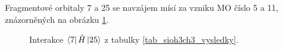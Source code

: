 \documentclass[
  digital, %
  table,   %
  lof,     %
  lot,     %
]{fithesis3}
\begin{document}
Fragmentové orbitaly  7 a 25 se navzájem mísí za vzniku MO číslo 5 a 11, znázorněných na obrázku \ref{obr_sioh3ch3_vysledky_II}.   
\begin{figure}
\begin{center}
\caption{Interakce $\bra{7}{\hat{H}}\ket{25}$ z tabulky \ref{tab_sioh3ch3_vysledky}.}

\label{obr_sioh3ch3_vysledky_II}\end{center}
\end{figure} 

 \clearpage
   
\end{document}
